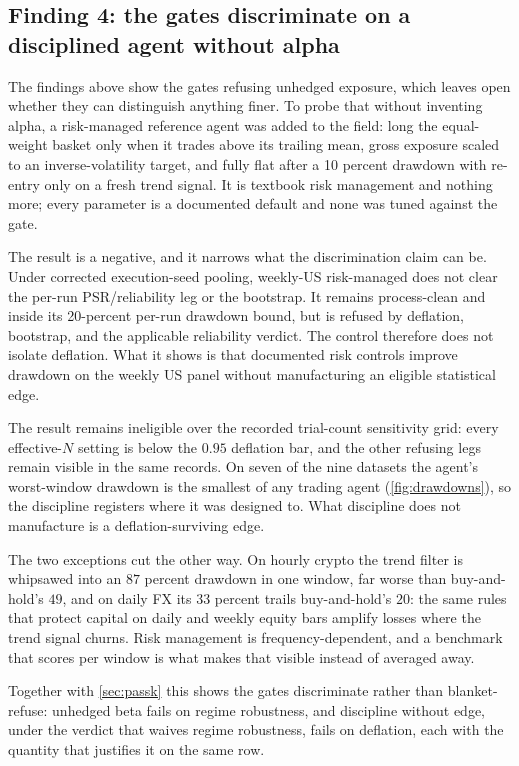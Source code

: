 \subsection{Finding 4: the gates discriminate on a disciplined agent without alpha}\label{sec:riskmanaged}

The findings above show the gates refusing unhedged exposure, which leaves open whether they can distinguish anything finer. To probe that without inventing alpha, a risk-managed reference agent was added to the field: long the equal-weight basket only when it trades above its trailing mean, gross exposure scaled to an inverse-volatility target, and fully flat after a 10 percent drawdown with re-entry only on a fresh trend signal. It is textbook risk management and nothing more; every parameter is a documented default and none was tuned against the gate.

The result is a negative, and it narrows what the discrimination claim can be. Under corrected execution-seed pooling, weekly-US risk-managed does not clear the per-run PSR/reliability leg or the bootstrap. It remains process-clean and inside its 20-percent per-run drawdown bound, but is refused by deflation, bootstrap, and the applicable reliability verdict. The control therefore does not isolate deflation. What it shows is that documented risk controls improve drawdown on the weekly US panel without manufacturing an eligible statistical edge.

The result remains ineligible over the recorded trial-count sensitivity grid: every effective-$N$ setting is below the $0.95$ deflation bar, and the other refusing legs remain visible in the same records. On seven of the nine datasets the agent's worst-window drawdown is the smallest of any trading agent (\cref{fig:drawdowns}), so the discipline registers where it was designed to. What discipline does not manufacture is a deflation-surviving edge.

The two exceptions cut the other way. On hourly crypto the trend filter is whipsawed into an $87$ percent drawdown in one window, far worse than buy-and-hold's $49$, and on daily FX its $33$ percent trails buy-and-hold's $20$: the same rules that protect capital on daily and weekly equity bars amplify losses where the trend signal churns. Risk management is frequency-dependent, and a benchmark that scores per window is what makes that visible instead of averaged away.

Together with \cref{sec:passk} this shows the gates discriminate rather than blanket-refuse: unhedged beta fails on regime robustness, and discipline without edge, under the verdict that waives regime robustness, fails on deflation, each with the quantity that justifies it on the same row.

